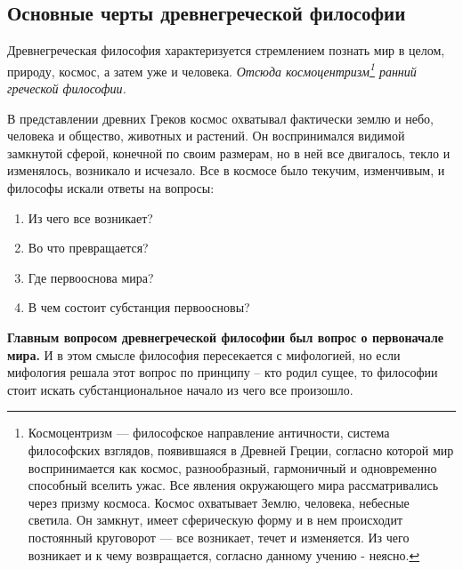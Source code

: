 \documentclass[
]{article}
\providecommand{\tightlist}{%
  \setlength{\itemsep}{0pt}\setlength{\parskip}{0pt}}
\begin{document}
\hypertarget{ux43eux441ux43dux43eux432ux43dux44bux435-ux447ux435ux440ux442ux44b-ux434ux440ux435ux432ux43dux435ux433ux440ux435ux447ux435ux441ux43aux43eux439-ux444ux438ux43bux43eux441ux43eux444ux438ux438}{%
\subsection{Основные черты древнегреческой
философии}\label{ux43eux441ux43dux43eux432ux43dux44bux435-ux447ux435ux440ux442ux44b-ux434ux440ux435ux432ux43dux435ux433ux440ux435ux447ux435ux441ux43aux43eux439-ux444ux438ux43bux43eux441ux43eux444ux438ux438}}

Древнегреческая философия характеризуется стремлением познать мир в
целом, природу, космос, а затем уже и человека. \emph{Отсюда
космоцентризм\footnote{Космоцентризм --- философское направление
  античности, система философских взглядов, появившаяся в Древней
  Греции, согласно которой мир воспринимается как космос, разнообразный,
  гармоничный и одновременно способный вселить ужас. Все явления
  окружающего мира рассматривались через призму космоса. Космос
  охватывает Землю, человека, небесные светила. Он замкнут, имеет
  сферическую форму и в нем происходит постоянный круговорот --- все
  возникает, течет и изменяется. Из чего возникает и к чему
  возвращается, согласно данному учению - неясно.} ранний греческой
философии.}

В представлении древних Греков космос охватывал фактически землю и небо,
человека и общество, животных и растений. Он воспринимался видимой
замкнутой сферой, конечной по своим размерам, но в ней все двигалось,
текло и изменялось, возникало и исчезало. Все в космосе было текучим,
изменчивым, и философы искали ответы на вопросы:

\begin{enumerate}
\def\labelenumi{\arabic{enumi}.}
\tightlist
\item
  Из чего все возникает?
\item
  Во что превращается?
\item
  Где первооснова мира?
\item
  В чем состоит субстанция первоосновы?
\end{enumerate}

\textbf{Главным вопросом древнегреческой философии был вопрос о
первоначале мира.} И в этом смысле философия пересекается с мифологией,
но если мифология решала этот вопрос по принципу -- кто родил сущее, то
философии стоит искать субстанциональное начало из чего все произошло.
\end{document}
